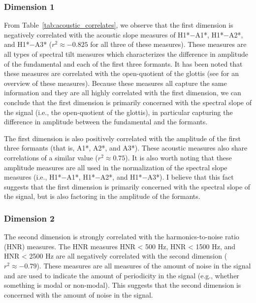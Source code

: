 \subsubsection{Dimension 1} \label{sec:acousticlandscape:dim1}
From Table~\ref{tab:acoustic_correlates}, we observe that the first dimension is negatively correlated with the acoustic slope measures of H1*$-$A1*, H1*$-$A2*, and H1*$-$A3* ($r^{2} \approx -0.825$ for all three of these measures). These measures are all types of spectral tilt measures which characterizes the difference in amplitude of the fundamental and each of the first three formants. It has been noted that these measures are correlated with the open-quotient of the glottis (see \cite{garellekPhoneticsVoice2019,garellekTheoreticalAchievementsPhonetics2022} for an overview of these measures). Because these measures all capture the same information and they are all highly correlated with the first dimension, we can conclude that the first dimension is primarily concerned with the spectral slope of the signal (i.e., the open-quotient of the glottis), in particular capturing the difference in amplitude between the fundamental and the formants.

The first dimension is also positively correlated with the amplitude of the first three formants (that is, A1*, A2*, and A3*). These acoustic measures also share correlations of a similar value ($r^{2} \approx 0.75$). It is also worth noting that these amplitude measures are all used in the normalization of the spectral slope measures (i.e., H1*$-$A1*, H1*$-$A2*, and H1*$-$A3*). I believe that this fact suggests that the first dimension is primarily concerned with the spectral slope of the signal, but is also factoring in the amplitude of the formants.

\subsubsection{Dimension 2} \label{sec:acousticlandscape:dim2}
The second dimension is strongly correlated with the harmonics-to-noise ratio (HNR) measures. The HNR measures HNR < 500 Hz, HNR < 1500 Hz, and HNR < 2500 Hz are all negatively correlated with the second dimension ($r^{2} \approx -0.79$). These measures are all measures of the amount of noise in the signal and are used to indicate the amount of periodicity in the signal (e.g., whether something is modal or non-modal). This suggests that the second dimension is concerned with the amount of noise in the signal.


